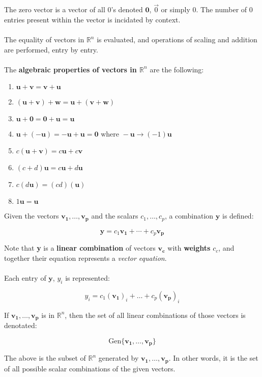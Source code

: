 \documentclass[12pt]{article}
\newcommand{\gen}[1]{\mathrm{Gen}\{{#1}\}}
\newcommand{\R}{\mathbb{R}}
\newcommand{\bt}[1]{\textbf{{#1}}}
\newcommand{\bm}[1]{\mathbf{{#1}}}
\begin{document}
The zero vector is a vector of all $0$'s denoted $\bm{0}$, $\vec{0}$ or simply $0$. The number of $0$ entries present within the vector is incidated by context. \\ \\

The equality of vectors in $\mathbb{R}^n$ is evaluated, and operations of scaling and addition are performed, entry by entry. \\ \\

The \textbf{algebraic properties of vectors in $\mathbb{R}^n$} are the following:

\begin{enumerate}
    \item $\bm{u + v = v + u}$
    \item $\bm{(u + v) + w = u + (v + w)}$
    \item $\bm{u + 0 = 0 + u = u}$
    \item $\bm{u + (-u) = -u + u = 0} \textrm{ where } -\bm{u} \rightarrow (-1)\bm{u}$
    \item $c(\bm{u} + \bm{v}) = c\bm{u} + c\bm{v}$
    \item $(c + d)\bm{u} = c\bm{u} + d\bm{u}$
    \item $c(d\bm{u}) = (cd)(\bm{u})$
    \item $1\bm{u} = \bm{u}$
\end{enumerate}

Given the vectors $\bm{v_1},\dots,\bm{v_p}$ and the scalars $c_1,\dots,c_p$, a combination $\bm{y}$ is defined:

$$\bm{y} = c_1\bm{v_1} + \cdots + c_p\bm{v_p}$$

Note that \bt{y} is a \textbf{linear combination} of vectors $\bm{v_c}$ with \textbf{weights} $c_c$, and together their
equation represents a \emph{vector equation}. \\ \\

Each entry of $\bm{y}$, $y_i$ is represented:

$$y_i = c_1(\bm{v_1})_i + \dots + c_p (\bm{v_p})_i$$

If $\bm{v_1,\dots,v_p}$ is in $\mathbb{R}^n$, then the set of all linear combinations of those vectors is denotated:

$$\gen{\bm{v_1},\dots,\bm{v_p}}$$

The above is the subset of $\R^n$ generated by $\bm{v_1},\dots,\bm{v_p}$.  In other words, it is the set of all possible scalar combinations of the given vectors. \\ \\
\end{document}
